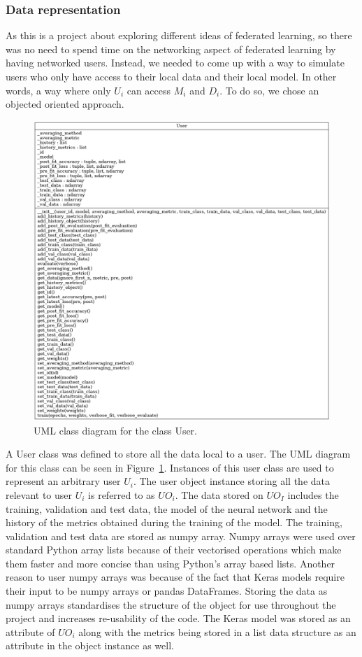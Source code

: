 \documentclass[12pt]{article}
\begin{document}
\subsubsection{Data representation}\label{subsubsec:datarep}
As this is a project about exploring different ideas of federated learning, so there was no need to spend time on the networking aspect of federated learning by having networked users. Instead, we needed to come up with a way to simulate users who only have access to their local data and their local model. In other words, a way where only $U_i$ can access $M_i$ and $D_i$. To do so, we chose an objected oriented approach.
\begin{figure}[H]
	\centering
	\includegraphics[width=\linewidth]{resources/classes_User.png}
	\caption{UML class diagram for the class User.}
	\label{fig:classes_user}
\end{figure}
\noindent A User class was defined to store all the data local to a user. The UML diagram for this class can be seen in Figure~\ref{fig:classes_user}. Instances of this user class are used to represent an arbitrary user $U_i$. The user object instance storing all the data relevant to user $U_i$ is referred to as $UO_i$. The data stored on $UO_I$ includes the training, validation and test data, the model of the neural network and the history of the metrics obtained during the training of the model. The training, validation and test data are stored as numpy array. Numpy arrays were used over standard Python array lists because of their vectorised operations  which make them faster and more concise than using Python's array based lists. Another reason to user numpy arrays was because of the fact that Keras models require their input to be numpy arrays or pandas DataFrames. Storing the data as numpy arrays standardises the structure of the object for use throughout the project and increases re-usability of the code. The Keras model was stored as an attribute of $UO_i$ along with the metrics being stored in a list data structure as an attribute in the object instance as well.
\end{document}
